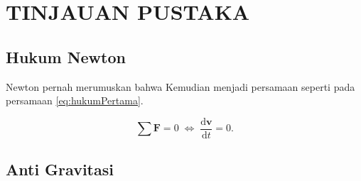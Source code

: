 \section{TINJAUAN PUSTAKA}


\subsection{Hukum Newton}

Newton pernah merumuskan \citep{newtonLaw} bahwa \lipsum[8]
Kemudian menjadi persamaan seperti pada persamaan \ref{eq:hukumPertama}.

\begin{equation}
  \label{eq:hukumPertama}
  \sum \mathbf{F} = 0\; \Leftrightarrow\; \frac{\mathrm{d} \mathbf{v} }{\mathrm{d}t} = 0.
\end{equation}

\subsection{Anti Gravitasi}

\lipsum[9]